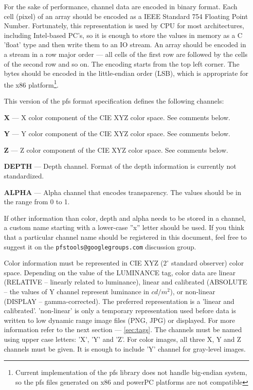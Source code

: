 \documentclass[a4paper,12pt,english]{article}
\begin{document}
For the sake of performance, channel data are encoded in binary
format. Each cell (pixel) of an array should be encoded as a IEEE
Standard 754 Floating Point Number. Fortunately, this representation
is used by CPU for most architectures, including Intel-based PC's, so
it is enough to store the values in memory as a C 'float' type and
then write them to an IO stream. An array should be encoded in a
stream in a row major order --- all cells of the first row are
followed by the cells of the second row and so on. The encoding starts
from the top left corner. The bytes should be encoded in the
little-endian order (LSB), which is appropriate for the x86
platform\footnote{Current implementation of the pfs library does not
  handle big-endian system, so the pfs files generated on x86 and
  powerPC platforms are not compatible}.

This version of the pfs format specification defines the following
channels:
\begin{description}
  \item {\bf X} --- X color component of the CIE XYZ color space. See comments below.
  \item {\bf Y} --- Y color component of the CIE XYZ color space. See comments below.
  \item {\bf Z} --- Z color component of the CIE XYZ color space. See comments below.
  \item {\bf DEPTH} --- Depth channel. Format of the depth information is currently not standardized.
  \item {\bf ALPHA} --- Alpha channel that encodes transparency. The values should be in the range from 0 to 1.
\end{description}
If other information than color, depth and alpha needs to be stored in
a channel, a custom name starting with a lower-case ''x'' letter
should be used. If you think that a particular channel name should be
registered in this document, feel free to suggest it on the {\tt pfstools@googlegroups.com} 
discussion group.

Color information must be represented in CIE XYZ ($2^\circ$ standard
observer) color space. Depending on the value of the LUMINANCE tag,
color data are linear (RELATIVE -- linearly related to luminance),
linear and calibrated (ABSOLUTE -- the values of Y channel represent
luminance in $cd/m^2$), or non-linear (DISPLAY -- gamma-corrected).
The preferred representation is a 'linear and calibrated'.
'non-linear' is only a temporary representation used before data is
written to low dynamic range image files (PNG, JPG) or displayed. For
more information refer to the next section --- \ref{sec:tags}. The
channels must be named using upper case letters: 'X', 'Y' and 'Z'. For
color images, all three X, Y and Z channels must be given. It is
enough to include 'Y' channel for gray-level images.
\end{document}
